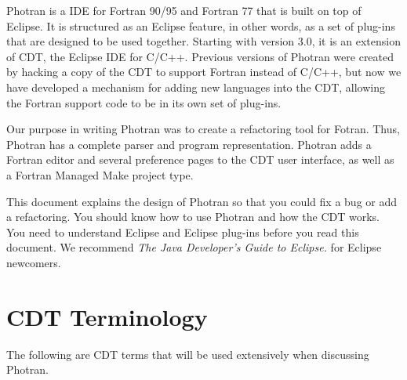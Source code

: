
Photran is a IDE for Fortran 90/95 and Fortran 77 that is built on top of
Eclipse.  It is structured as an Eclipse feature, in other words,
as a set of plug-ins that are designed to be used together.
Starting with version 3.0, it is an extension of CDT, the Eclipse IDE for
C/C++.  Previous versions of Photran were created by hacking a copy of the
CDT to support Fortran instead of C/C++, but now we have developed a
mechanism for adding new languages into the CDT, allowing the Fortran support
code to be in its own set of plug-ins.

Our purpose in writing Photran was to create a refactoring tool for Fotran.
Thus, Photran has a complete parser and program representation.  Photran
adds a Fortran editor and several preference pages to the CDT user interface,
as well as a Fortran Managed Make project type.

This document explains the design of Photran so that you could fix a bug or
add a refactoring.  You should know how to use Photran and how
the CDT works.  You need to understand Eclipse and Eclipse plug-ins
before you read this document.  We recommend \textit{The Java
Developer's Guide to Eclipse.} for Eclipse newcomers.

\section{CDT Terminology}

The following are CDT terms that will be used extensively when discussing
Photran.

